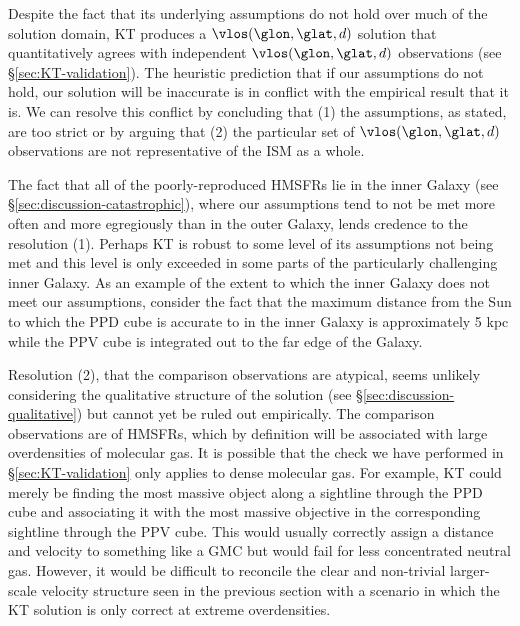 Despite the fact that its underlying assumptions do not hold over much of the solution domain, KT produces a $\vlos(\glon, \glat, d)$ solution that quantitatively agrees with independent $\vlos(\glon, \glat, d)$ observations (see \S \ref{sec:KT-validation}).
The heuristic prediction that if our assumptions do not hold, our solution will be inaccurate is in conflict with the empirical result that it is.
We can resolve this conflict by concluding that (1) the assumptions, as stated, are too strict or by arguing that (2) the particular set of $\vlos(\glon, \glat, d)$ observations are not representative of the ISM as a whole.

The fact that all of the poorly-reproduced HMSFRs lie in the inner Galaxy (see \S \ref{sec:discussion-catastrophic}), where our assumptions tend to not be met more often and more egregiously than in the outer Galaxy, lends credence to the resolution (1). 
Perhaps KT is robust to some level of its assumptions not being met and this level is only exceeded in some parts of the particularly challenging inner Galaxy. 
As an example of the extent to which the inner Galaxy does not meet our assumptions, consider the fact that the maximum distance from the Sun to which the PPD cube is accurate to in the inner Galaxy is approximately 5 kpc \citep{Green_2015} while the PPV cube is integrated out to the far edge of the Galaxy. 

Resolution (2), that the comparison observations are atypical, seems unlikely considering the qualitative structure of the solution (see \S \ref{sec:discussion-qualitative}) but cannot yet be ruled out empirically. 
The comparison observations are of HMSFRs, which by definition will be associated with large overdensities of molecular gas. 
It is possible that the check we have performed in \S \ref{sec:KT-validation} only applies to dense molecular gas.
For example, KT could merely be finding the most massive object along a sightline through the PPD cube and associating it with the most massive objective in the corresponding sightline through the PPV cube. 
This would usually correctly assign a distance and velocity to something like a GMC but would fail for less concentrated neutral gas. 
However, it would be difficult to reconcile the clear and non-trivial larger-scale velocity structure seen in the previous section with a scenario in which the KT solution is only correct at extreme overdensities. 

